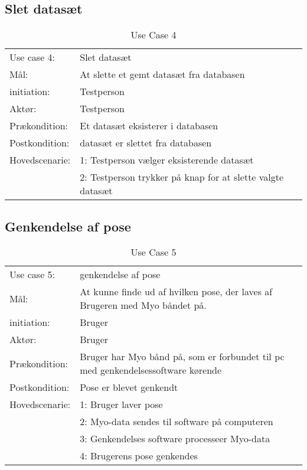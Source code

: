 \subsection{Slet datasæt}
\begin{center}
	\begin{table}[htbp]
		\begin{tabular}{lp{274pt}}
			\rowcolor{grey} Use case 4:	& Slet datasæt \\
			Mål:	& At slette et gemt datasæt fra databasen \\
			initiation:	& Testperson\\
			Aktør: & Testperson\\
			Prækondition: & Et datasæt eksisterer i databasen\\
			Postkondition: & datasæt er slettet fra databasen\\
			Hovedscenarie: & 1: Testperson vælger eksisterende datasæt\\
			& 2: Testperson trykker på knap for at slette valgte datasæt\\
		\end{tabular}
		\caption{Use Case 4}
	\end{table}
\end{center}

\subsection{Genkendelse af pose}
\begin{center}
	\begin{table}[htbp]
		\begin{tabular}{lp{274pt}}
			\rowcolor{grey} Use case 5:		& genkendelse af pose\\
			Mål: & At kunne finde ud af hvilken pose, der laves af Brugeren med Myo båndet på. \\
			initiation:	& Bruger \\
			Aktør: & Bruger\\
			Prækondition: & Bruger har Myo bånd på, som er forbundet til pc med genkendelsessoftware kørende \\
			Postkondition: & Pose er blevet genkendt \\
			Hovedscenarie: & 1: Bruger laver pose \\
			& 2: Myo-data sendes til software på computeren\\
			& 3: Genkendelses software processeer Myo-data\\
			& 4: Brugerens pose genkendes\\
		\end{tabular}
		\caption{Use Case 5}
	\end{table}
\end{center}

